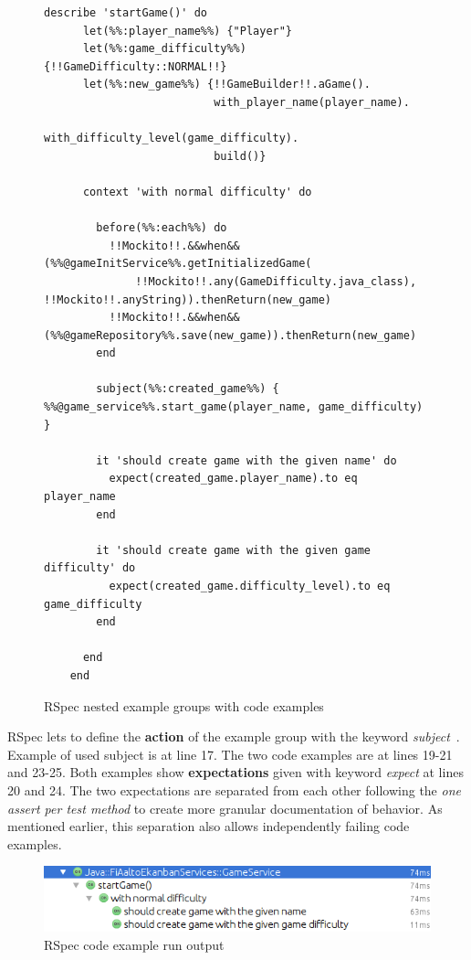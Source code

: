     \begin{figure}[H]
        \begin{lstlisting}[style=ruby]
    describe 'startGame()' do
      let(%%:player_name%%) {"Player"}
      let(%%:game_difficulty%%) {!!GameDifficulty::NORMAL!!}
      let(%%:new_game%%) {!!GameBuilder!!.aGame().
                          with_player_name(player_name).
                          with_difficulty_level(game_difficulty).
                          build()}

      context 'with normal difficulty' do

        before(%%:each%%) do
          !!Mockito!!.&&when&&(%%@gameInitService%%.getInitializedGame(
              !!Mockito!!.any(GameDifficulty.java_class), !!Mockito!!.anyString)).thenReturn(new_game)
          !!Mockito!!.&&when&&(%%@gameRepository%%.save(new_game)).thenReturn(new_game)
        end

        subject(%%:created_game%%) { %%@game_service%%.start_game(player_name, game_difficulty) }

        it 'should create game with the given name' do
          expect(created_game.player_name).to eq player_name
        end

        it 'should create game with the given game difficulty' do
          expect(created_game.difficulty_level).to eq game_difficulty
        end

      end
    end
        \end{lstlisting}
        \caption{RSpec nested example groups with code examples}
        \label{fig:rspec-example}
    \end{figure}

    RSpec lets to define the \textbf{action} of the example group with the keyword \textit{subject}~\cite{rspec-subject}. Example of used subject is at
    line 17. The two code examples are at lines 19-21 and 23-25.  Both examples show \textbf{expectations} given with keyword \textit{expect}
    at lines 20 and 24. The two expectations are separated from each other following the \textit{one assert per test method}
    to create more granular documentation of behavior. As mentioned earlier, this separation also allows independently failing code examples.
    \begin{figure}[H]
      \begin{center}
        \begin{topbot}[style=mdstyle]
        \includegraphics[width=\textwidth]{images/rspec-result.png}
        \end{topbot}
        \caption{RSpec code example run output}
        \label{fig:rspec-result}
      \end{center}
    \end{figure}

